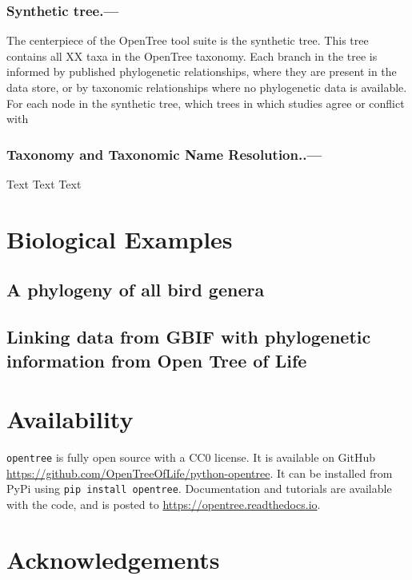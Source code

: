 \documentclass[oupdraft]{sysbio_sse}
\begin{document}
\subsubsection{Synthetic tree.---} The centerpiece of the OpenTree tool suite is the synthetic tree.
This tree contains all XX taxa in the OpenTree taxonomy.
Each branch in the tree is informed by published phylogenetic relationships, where they are present in the data store, or by taxonomic relationships where no phylogenetic data is available.
For each node in the synthetic tree, which trees in which studies agree or conflict with 

\subsubsection{Taxonomy and Taxonomic Name Resolution..---} Text Text Text 

\bigskip

\section{Biological Examples}
\label{sec4}

\subsection{A phylogeny of all bird genera}


\subsection{Linking data from GBIF with phylogenetic information from Open Tree of Life}

\bigskip

\section{Availability}
\label{sec5}

\texttt{opentree} is fully open source with a CC0 license. It is available on GitHub \url{ https://github.com/OpenTreeOfLife/python-opentree}. It can be installed from PyPi using \texttt{pip install opentree}. Documentation and tutorials are available with the code, and is posted to \url{https://opentree.readthedocs.io}.

\section{Acknowledgements}
\end{document}
